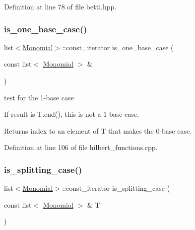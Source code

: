 Definition at line 78 of file betti.\+hpp.

\mbox{\label{group__commalg_gaed5cfd21d305dfc0d912bab347a82f65}} 
\subsubsection{\texorpdfstring{is\+\_\+one\+\_\+base\+\_\+case()}{is\_one\_base\_case()}}
{\footnotesize\ttfamily list$<$\hyperlink{group__polygroup_class_monomial}{Monomial}$>$\+::const\+\_\+iterator is\+\_\+one\+\_\+base\+\_\+case (\begin{DoxyParamCaption}\item[{const list$<$ \hyperlink{group__polygroup_class_monomial}{Monomial} $>$ \&}]{ }\end{DoxyParamCaption})}



test for the 1-\/base case \cite{Bigatti97} 

If result is {\ttfamily T.\+end()}, this is not a 1-\/base case. \begin{DoxyReturn}{Returns}
index to an element of {\ttfamily T} that makes the 0-\/base case. 
\end{DoxyReturn}


Definition at line 106 of file hilbert\+\_\+functions.\+cpp.

\mbox{\label{group__commalg_ga26c5ece1df1c4db4873925f41ed8ee9c}} 
\subsubsection{\texorpdfstring{is\+\_\+splitting\+\_\+case()}{is\_splitting\_case()}}
{\footnotesize\ttfamily list$<$\hyperlink{group__polygroup_class_monomial}{Monomial}$>$\+::const\+\_\+iterator is\+\_\+splitting\+\_\+case (\begin{DoxyParamCaption}\item[{const list$<$ \hyperlink{group__polygroup_class_monomial}{Monomial} $>$ \&}]{T }\end{DoxyParamCaption})}



